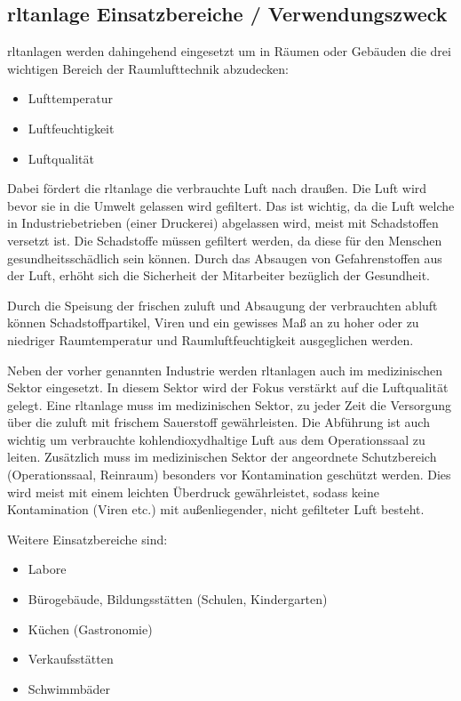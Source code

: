 \newpage
\subsection{\ac{rltanlage} Einsatzbereiche / Verwendungszweck}

\ac{rltanlage}n werden dahingehend eingesetzt um in Räumen oder Gebäuden die drei wichtigen Bereich der Raumlufttechnik abzudecken:

\begin{itemize}
	\item Lufttemperatur
	\item Luftfeuchtigkeit
	\item Luftqualität
\end{itemize} 

Dabei fördert die \ac{rltanlage} die verbrauchte Luft nach draußen. Die Luft wird bevor sie in die Umwelt gelassen wird gefiltert. Das ist wichtig, da die Luft welche in Industriebetrieben (\zB einer Druckerei) abgelassen wird, meist mit Schadstoffen versetzt ist. Die Schadstoffe müssen gefiltert werden, da diese für den Menschen gesundheitsschädlich sein können. Durch das Absaugen von Gefahrenstoffen aus der Luft, erhöht sich die Sicherheit der Mitarbeiter bezüglich der Gesundheit.

Durch die Speisung der frischen \gls{zuluft} und Absaugung der verbrauchten \gls{abluft} können Schadstoffpartikel, Viren und ein gewisses Maß an zu hoher oder zu niedriger Raumtemperatur und Raumluftfeuchtigkeit ausgeglichen werden. 
\cite[vgl.][]{DGWZ:o.J.}

Neben der vorher genannten Industrie werden \ac{rltanlage}n auch im medizinischen Sektor eingesetzt. In diesem Sektor wird der Fokus verstärkt auf die Luftqualität gelegt. Eine \ac{rltanlage} muss im medizinischen Sektor, zu jeder Zeit die Versorgung über die \gls{zuluft} mit frischem Sauerstoff gewährleisten. Die Abführung ist auch wichtig um verbrauchte kohlendioxydhaltige Luft aus dem Operationssaal zu leiten. Zusätzlich muss im medizinischen Sektor der angeordnete Schutzbereich (\zB Operationssaal, Reinraum) besonders vor Kontamination geschützt werden. Dies wird meist mit einem leichten Überdruck gewährleistet, sodass keine Kontamination (Viren etc.) mit außenliegender, nicht gefilteter Luft besteht.
\cite[vgl.][]{robatherm:2019,robatherm:o.J.}

\newpage
Weitere Einsatzbereiche sind:
\begin{itemize}
	\item Labore
	\item Bürogebäude, Bildungsstätten (Schulen, Kindergarten)
	\item Küchen (Gastronomie)
	\item Verkaufsstätten
	\item Schwimmbäder
\end{itemize} 
\cite[vgl.][]{robatherm:2019,induux_wiki:2023}

